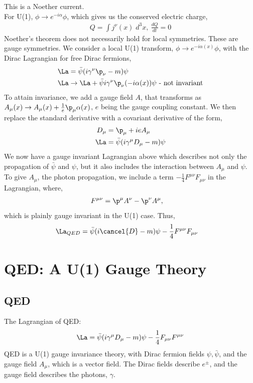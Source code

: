 \documentclass[a4paper, 11pt, normalem]{report}
\begin{document}
This is a Noether current. \\
For U(1), $\phi\to e^{-i\alpha}\phi$, which gives us the conserved electric charge,
\begin{align}
    Q = \int j^\nu(x)\;d^3x,~ \frac{dQ}{dt} = 0
\end{align}
Noether's theorem does not necessarily hold for local symmetries.
These are gauge symmetries.
We consider a local U(1) transform, $\phi\to e^{-i\alpha(x)}\phi$, with the Dirac Lagrangian for free Dirac fermions,
\begin{align}
    \La &= \bar{\psi}(i\gamma^\nu\p_\nu - m)\psi \\
    \La &\to \La + \bar{\psi}i\gamma^\nu\p_\nu(-i\alpha(x))\psi \text{ - not invariant}
\end{align}
To attain invariance, we add a gauge field $A$, that transforms as $A_\mu(x)\to A_\mu(x)+\frac{1}{e}\p_\mu\alpha(x)$, $e$ being the gauge coupling constant.
We then replace the standard derivative with a covariant derivative of the form,
\begin{align}
    D_\mu &= \p_\mu + ieA_\mu \\
    \La &= \bar{\psi}(i\gamma^\mu D_\mu - m)\psi
\end{align}
We now have a gauge invariant Lagrangian above which describes not only the propagation of $\bar{\psi}$ and $\psi$, but it also includes the interaction between $A_\mu$ and $\psi$.
To give $A_\mu$, the photon propagation, we include a term $-\frac14 F^{\mu\nu}F_{\mu\nu}$ in the Lagrangian, where,
\begin{align}
    F^{\mu\nu} &= \p^\mu A^\nu - \p^\nu A^\mu,
\end{align}
which is plainly gauge invariant in the U(1) case.
Thus,
\begin{align}
    \La_{QED} &= \bar{\psi}(i\cancel{D} - m)\psi - \frac14 F^{\mu\nu}F_{\mu\nu}
\end{align}


\chapter{QED: A U(1) Gauge Theory}
\section{QED}
The Lagrangian of QED:
\begin{align}
    \La = \bar{\psi}(i\gamma^\mu D_\mu - m)\psi - \frac14 F_{\mu\nu}F^{\mu\nu}
\end{align}
QED is a U(1) gauge invariance theory, with Dirac fermion fields $\psi,\bar{\psi}$, and the gauge field $A_\mu$, which is a vector field.
The Dirac fields describe $e^{\pm}$, and the gauge field describes the photons, $\gamma$.
\end{document}
